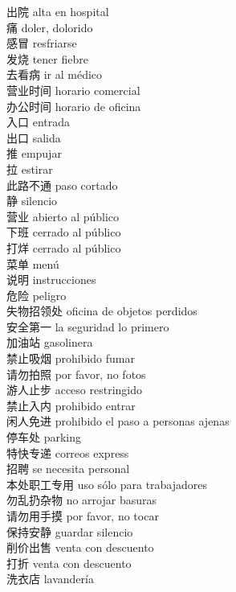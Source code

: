 \documentclass[13pt]{article}
\begin{document}
\begin{CJK*}{UTF8}{gkai}
\begin{multicols}{2}
\begin{pinyinscope}
出院 \quad alta en hospital\\
痛 \quad doler, dolorido\\
感冒 \quad resfriarse\\
发烧 \quad tener fiebre\\
去看病 \quad ir al médico\\
营业时间 \quad horario comercial\\
办公时间 \quad horario de oficina\\
入口 \quad entrada\\
出口 \quad salida\\
推 \quad empujar\\
拉 \quad estirar\\
此路不通 \quad paso cortado\\
静 \quad silencio\\
营业 \quad abierto al público\\
下班 \quad cerrado al público\\
打烊 \quad cerrado al público\\
菜单 \quad menú\\
说明 \quad instrucciones\\
危险 \quad peligro\\
失物招领处 \quad oficina de objetos perdidos\\
安全第一 \quad la seguridad lo primero\\
加油站 \quad gasolinera\\
禁止吸烟 \quad prohibido fumar\\
请勿拍照 \quad por favor, no fotos\\
游人止步 \quad acceso restringido\\
禁止入内 \quad prohibido entrar\\
闲人免进 \quad prohibido el paso a personas ajenas\\
停车处 \quad parking\\
特快专递 \quad correos express\\
招聘 \quad se necesita personal\\
本处职工专用 \quad uso sólo para trabajadores\\
勿乱扔杂物 \quad no arrojar basuras\\
请勿用手摸 \quad por favor, no tocar\\
保持安静 \quad guardar silencio\\
削价出售 \quad venta con descuento\\
打折 \quad venta con descuento\\
洗衣店 \quad lavandería\\

\end{pinyinscope}
\end{multicols}
\end{CJK*}
\end{document}
